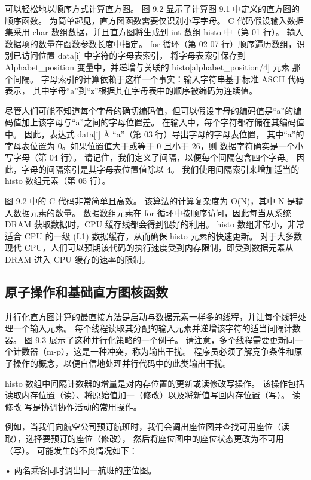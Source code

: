 可以轻松地以顺序方式计算直方图。 图 9.2 显示了计算图 9.1 中定义的直方图的顺序函数。 
为简单起见，直方图函数需要仅识别小写字母。 
C 代码假设输入数据集采用 char 数组数据，并且直方图将生成到 int 数组 histo 中（第 01 行）。 
输入数据项的数量在函数参数长度中指定。 
for 循环（第 02-07 行）顺序遍历数组，识别已访问位置 data[i] 中字符的字母表索引，
将字母表索引保存到 Alphabet\_position 变量中，并递增与关联的 histo[alphabet\_position/4] 元素 那个间隔。 
字母索引的计算依赖于这样一个事实：输入字符串基于标准 ASCII 代码表示，
其中字母“a”到“z”根据其在字母表中的顺序被编码为连续值。

尽管人们可能不知道每个字母的确切编码值，但可以假设字母的编码值是“a”的编码值加上该字母与“a”之间的字母位置差。 
在输入中，每个字符都存储在其编码值中。 因此，表达式 data[i] À “a”（第 03 行）导出字母的字母表位置，
其中“a”的字母表位置为 0。如果位置值大于或等于 0 且小于 26，则 数据字符确实是一个小写字母（第 04 行）。 
请记住，我们定义了间隔，以便每个间隔包含四个字母。 因此，字母的间隔索引是其字母表位置值除以 4。
我们使用间隔索引来增加适当的 histo 数组元素（第 05 行）。

图 9.2 中的 C 代码非常简单且高效。 该算法的计算复杂度为 O(N)，其中 N 是输入数据元素的数量。 
数据数组元素在 for 循环中按顺序访问，因此每当从系统 DRAM 获取数据时，CPU 缓存线都会得到很好的利用。 
histo 数组非常小，非常适合 CPU 的一级 (L1) 数据缓存，从而确保 histo 元素的快速更新。 
对于大多数现代 CPU，人们可以预期该代码的执行速度受到内存限制，即受到数据元素从 DRAM 进入 CPU 缓存的速率的限制。

\subsection{原子操作和基础直方图核函数}
并行化直方图计算的最直接方法是启动与数据元素一样多的线程，并让每个线程处理一个输入元素。 
每个线程读取其分配的输入元素并递增该字符的适当间隔计数器。 图 9.3 展示了这种并行化策略的一个例子。 
请注意，多个线程需要更新同一个计数器（m-p），这是一种冲突，称为输出干扰。 
程序员必须了解竞争条件和原子操作的概念，以便自信地处理并行代码中的此类输出干扰。

histo 数组中间隔计数器的增量是对内存位置的更新或读修改写操作。 
该操作包括读取内存位置（读）、将原始值加一（修改）以及将新值写回内存位置（写）。 读-修改-写是协调协作活动的常用操作。

例如，当我们向航空公司预订航班时，我们会调出座位图并查找可用座位（读取），选择要预订的座位（修改），
然后将座位图中的座位状态更改为不可用 （写）。 可能发生的不良情况如下：

• 两名乘客同时调出同一航班的座位图。

